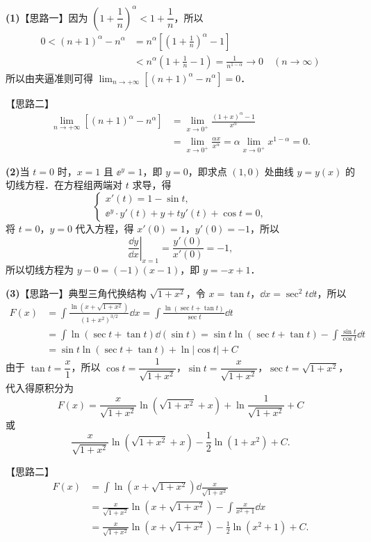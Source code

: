 \begin{solution}
\textbf{(1)}【思路一】因为 $\left(1+\dfrac{1}{n}\right)^{\alpha}<1+\dfrac{1}{n}$，所以
\begin{align*}
0<(n+1)^{\alpha}-n^{\alpha}
&=n^{\alpha}\left[\left(1+\frac{1}{n}\right)^{\alpha}-1\right]\\
&<n^{\alpha}\left(1+\frac{1}{n}-1\right)=\frac{1}{n^{1-\alpha}}\to 0\quad(n\to\infty)
\end{align*}
所以由夹逼准则可得 $\displaystyle\lim_{n\to+\infty}\left[(n+1)^{\alpha}-n^{\alpha}\right]=0$．

【思路二】
\begin{align*}
\lim_{n\to+\infty}\left[(n+1)^{\alpha}-n^{\alpha}\right]
&=\lim_{x\to 0^{+}}\frac{(1+x)^{\alpha}-1}{x^{\alpha}}\\
&=\lim_{x\to 0^{+}}\frac{\alpha x}{x^{\alpha}}=\alpha\lim_{x\to 0^{+}}x^{1-\alpha}=0.
\end{align*}

\textbf{(2)}当 $t=0$ 时，$x=1$ 且 $\ee^{y}=1$，即 $y=0$，即求点 $(1,0)$ 处曲线 $y=y(x)$ 的切线方程．在方程组两端对 $t$ 求导，得
\[
\begin{cases}
x'(t)=1-\sin t,\\
\ee^{y}\cdot y'(t)+y+ty'(t)+\cos t=0,
\end{cases}
\]
将 $t=0$，$y=0$ 代入方程，得 $x'(0)=1$，$y'(0)=-1$，所以
\[
\left.\frac{\dd y}{\dd x}\right|_{x=1}=\frac{y'(0)}{x'(0)}=-1,
\]
所以切线方程为 $y-0=(-1)(x-1)$，即 $y=-x+1$．

\textbf{(3)}【思路一】典型三角代换结构 $\sqrt{1+x^{2}}$，令 $x=\tan t$，$\dd x=\sec^{2}t\dd t$，所以
\begin{align*}
F(x)&=\int\frac{\ln\left(x+\sqrt{1+x^{2}}\right)}{\left(1+x^{2}\right)^{3/2}}\dd x=\int\frac{\ln(\sec t+\tan t)}{\sec t}\dd t\\
&=\int\ln(\sec t+\tan t)\dd(\sin t)=\sin t\ln(\sec t+\tan t)-\int\frac{\sin t}{\cos t}\dd t\\
&=\sin t\ln(\sec t+\tan t)+\ln|\cos t|+C
\end{align*}
由于 $\tan t=\dfrac{x}{1}$，所以 $\cos t=\dfrac{1}{\sqrt{1+x^{2}}}$，$\sin t=\dfrac{x}{\sqrt{1+x^{2}}}$，$\sec t=\sqrt{1+x^{2}}$，代入得原积分为
\[
F(x)=\frac{x}{\sqrt{1+x^{2}}}\ln\left(\sqrt{1+x^{2}}+x\right)+\ln\frac{1}{\sqrt{1+x^{2}}}+C
\]
或
\[
\frac{x}{\sqrt{1+x^{2}}}\ln\left(\sqrt{1+x^{2}}+x\right)-\frac{1}{2}\ln\left(1+x^{2}\right)+C.
\]

【思路二】
\begin{align*}
F(x)&=\int\ln\left(x+\sqrt{1+x^{2}}\right)\dd\frac{x}{\sqrt{1+x^{2}}}\\
&=\frac{x}{\sqrt{1+x^{2}}}\ln\left(x+\sqrt{1+x^{2}}\right)-\int\frac{x}{x^{2}+1}\dd x\\
&=\frac{x}{\sqrt{1+x^{2}}}\ln\left(x+\sqrt{1+x^{2}}\right)-\frac{1}{2}\ln\left(x^{2}+1\right)+C.
\end{align*}


\end{solution}
